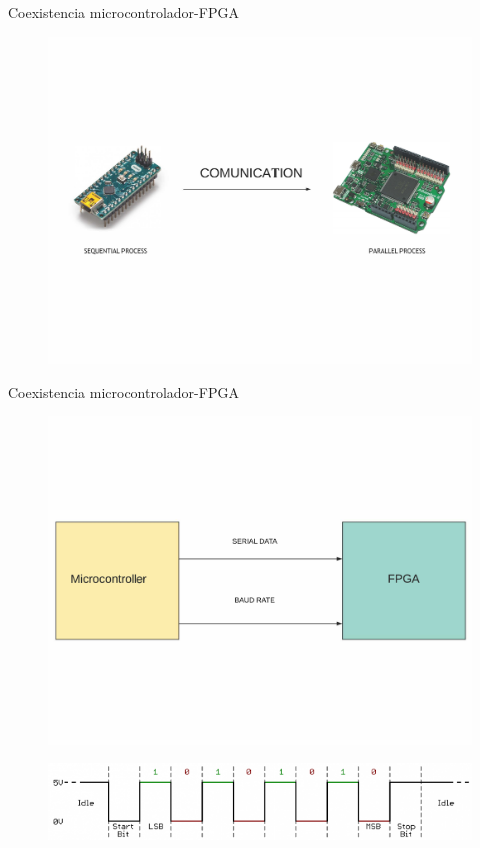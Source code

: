 \documentclass{beamer}
\begin{document}
\begin{frame}{Coexistencia microcontrolador-FPGA}
	\begin{figure}[H]
		\center
		\includegraphics[trim = 0mm 40mm 0mm 20mm, clip,scale=0.4]{imagenes/Balancing_robot/coexistencia1.pdf}
	\end{figure}
\end{frame}

\begin{frame}{Coexistencia microcontrolador-FPGA}
\begin{figure}[H]
	\center
	\includegraphics[trim = 0mm 40mm 0mm 20mm, clip,scale=0.3]{imagenes/Balancing_robot/coexistencia2.pdf}
\end{figure}
\begin{center}
	\begin{figure}[H]
		\center
		\includegraphics[scale=0.75, angle=0]{imagenes/Balancing_Robot/serial_comunicattion.png}
	\end{figure}
\end{center}
\end{frame}
\end{document}
